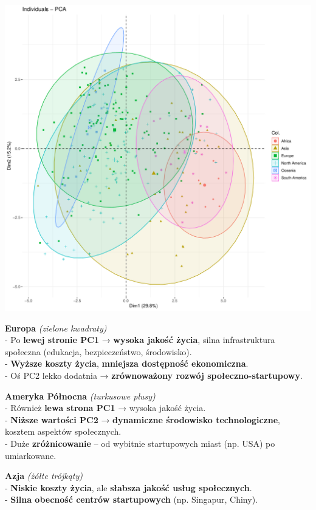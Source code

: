 \documentclass[
  12pt,
]{article}
\begin{document}
\begin{center}\includegraphics{Sprawozdanie2_files/figure-latex/wykres_2D-1} \end{center}

\textbf{Europa} \emph{(zielone kwadraty)}\\
- Po \textbf{lewej stronie PC1} → \textbf{wysoka jakość życia}, silna
infrastruktura społeczna (edukacja, bezpieczeństwo, środowisko).\\
- \textbf{Wyższe koszty życia}, \textbf{mniejsza dostępność
ekonomiczna}.\\
- Oś PC2 lekko dodatnia → \textbf{zrównoważony rozwój
społeczno-startupowy}.

\textbf{Ameryka Północna} \emph{(turkusowe plusy)}\\
- Również \textbf{lewa strona PC1} → wysoka jakość życia.\\
- \textbf{Niższe wartości PC2} → \textbf{dynamiczne środowisko
technologiczne}, kosztem aspektów społecznych.\\
- Duże \textbf{zróżnicowanie} -- od wybitnie startupowych miast (np.
USA) po umiarkowane.

\textbf{Azja} \emph{(żółte trójkąty)}\\
- \textbf{Niskie koszty życia}, ale \textbf{słabsza jakość usług
społecznych}.\\
- \textbf{Silna obecność centrów startupowych} (np. Singapur, Chiny).
\end{document}

